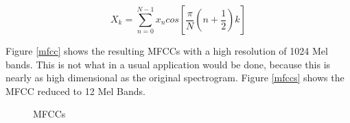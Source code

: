 \begin{equation} \label{eq:dct}
X_k = \sum_{n=0}^{N-1}{x_n cos\left[{\frac{\pi}{N}(n + \frac{1}{2})k}\right]}
\end{equation}

Figure \ref{mfcc} shows the resulting MFCCs with a high resolution of 1024 Mel bands. This is not what in a usual application would be done, because this is nearly as high dimensional as the original spectrogram. Figure \ref{mfccs} shows the MFCC reduced to 12 Mel Bands.


\begin{figure}[htbp]
	\centering
	\caption{MFCCs}	
	\label{fig:mfcc}
\end{figure}
